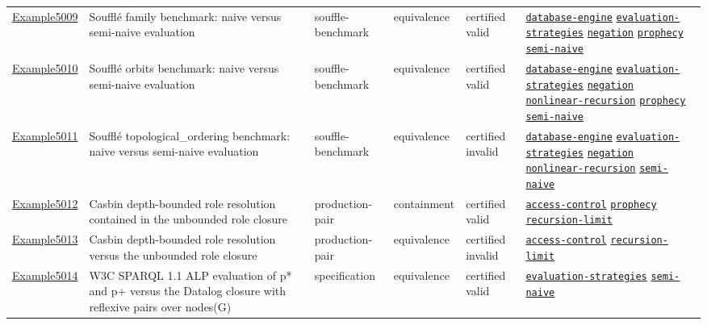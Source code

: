 \documentclass[10pt]{article}
\begin{document}
\begin{longtable}{@{}lp{}p{}p{}p{}p{}@{}}
\hyperref[case:Example5009]{Example5009} & Soufflé family benchmark: naive versus semi-naive evaluation & souffle-benchmark & equivalence & certified valid & {\scriptsize \hyperref[tag:database-engine]{\texttt{database-engine}} \hyperref[tag:evaluation-strategies]{\texttt{evaluation-strategies}} \hyperref[tag:negation]{\texttt{negation}} \hyperref[tag:prophecy]{\texttt{prophecy}} \hyperref[tag:semi-naive]{\texttt{semi-naive}}} \\
\hyperref[case:Example5010]{Example5010} & Soufflé orbits benchmark: naive versus semi-naive evaluation & souffle-benchmark & equivalence & certified valid & {\scriptsize \hyperref[tag:database-engine]{\texttt{database-engine}} \hyperref[tag:evaluation-strategies]{\texttt{evaluation-strategies}} \hyperref[tag:negation]{\texttt{negation}} \hyperref[tag:nonlinear-recursion]{\texttt{nonlinear-recursion}} \hyperref[tag:prophecy]{\texttt{prophecy}} \hyperref[tag:semi-naive]{\texttt{semi-naive}}} \\
\hyperref[case:Example5011]{Example5011} & Soufflé topological\_ordering benchmark: naive versus semi-naive evaluation & souffle-benchmark & equivalence & certified invalid & {\scriptsize \hyperref[tag:database-engine]{\texttt{database-engine}} \hyperref[tag:evaluation-strategies]{\texttt{evaluation-strategies}} \hyperref[tag:negation]{\texttt{negation}} \hyperref[tag:nonlinear-recursion]{\texttt{nonlinear-recursion}} \hyperref[tag:semi-naive]{\texttt{semi-naive}}} \\
\hyperref[case:Example5012]{Example5012} & Casbin depth-bounded role resolution contained in the unbounded role closure & production-pair & containment & certified valid & {\scriptsize \hyperref[tag:access-control]{\texttt{access-control}} \hyperref[tag:prophecy]{\texttt{prophecy}} \hyperref[tag:recursion-limit]{\texttt{recursion-limit}}} \\
\hyperref[case:Example5013]{Example5013} & Casbin depth-bounded role resolution versus the unbounded role closure & production-pair & equivalence & certified invalid & {\scriptsize \hyperref[tag:access-control]{\texttt{access-control}} \hyperref[tag:recursion-limit]{\texttt{recursion-limit}}} \\
\hyperref[case:Example5014]{Example5014} & W3C SPARQL 1.1 ALP evaluation of p* and p+ versus the Datalog closure with reflexive pairs over nodes(G) & specification & equivalence & certified valid & {\scriptsize \hyperref[tag:evaluation-strategies]{\texttt{evaluation-strategies}} \hyperref[tag:semi-naive]{\texttt{semi-naive}}} \\

\end{longtable}
\end{document}
